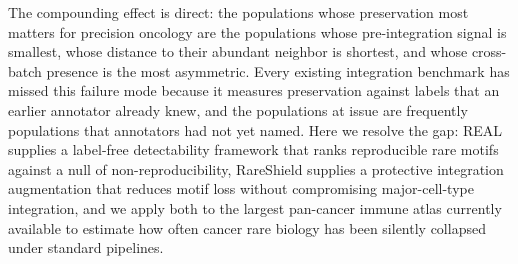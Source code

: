 The compounding effect is direct: the populations whose preservation most matters for precision oncology are the populations whose pre-integration signal is smallest, whose distance to their abundant neighbor is shortest, and whose cross-batch presence is the most asymmetric. Every existing integration benchmark has missed this failure mode because it measures preservation against labels that an earlier annotator already knew, and the populations at issue are frequently populations that annotators had not yet named. Here we resolve the gap: REAL supplies a label-free detectability framework that ranks reproducible rare motifs against a null of non-reproducibility, RareShield supplies a protective integration augmentation that reduces motif loss without compromising major-cell-type integration, and we apply both to the largest pan-cancer immune atlas currently available \citep{Kang2024PanCancerImmune} to estimate how often cancer rare biology has been silently collapsed under standard pipelines.
